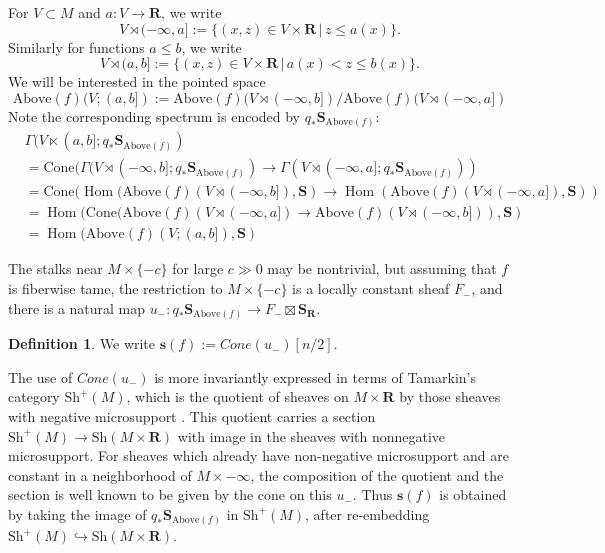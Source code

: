 \documentclass[12pt,a4paper]{article}
\numberwithin{equation}{section}
\theoremstyle{definition}
\newtheorem{dfn}[equation]{Definition}
\theoremstyle{remark}
\newcommand{\R}{\mathbf{R}}
\newcommand{\s}{\mathbf{s}}
\newcommand{\Sh}{\mathrm{Sh}}
\renewcommand{\S}{\mathbf{S}}
\DeclareMathOperator{\Hom}{Hom}
\begin{document}
For $V \subset M$ and $a: V \to \R$, we write
$$V \rtimes (-\infty, a] := \{(x, z) \in V \times \R\,|\, z \le a(x)\}.$$
Similarly for functions $a \le b$, we write
$$V \rtimes (a, b] := \{(x, z) \in V \times \R\,|\, a(x) < z \le b(x)\}.$$
We will be
interested in the
pointed space
$$\mathrm{Above}(f)(V; (a, b] ) :=
\mathrm{Above}(f)(V \rtimes (-\infty, b]) / \mathrm{Above}(f)(V \rtimes (-\infty, a])$$
Note the corresponding spectrum is encoded by
$q_* \S_{\mathrm{Above}(f)}$:
\begin{align} \label{Above f sheaf versus space}
\nonumber & \Gamma(V \ltimes (a, b]; q_* \S_{\mathrm{Above}(f)}) \\
\nonumber & =
\mathrm{Cone}(\Gamma(V \rtimes (-\infty, b]; q_* \S_{\mathrm{Above}(f)}) \to \Gamma(V \rtimes (-\infty, a]; q_* \S_{\mathrm{Above}(f)}))  \\
\nonumber & = \mathrm{Cone}( \Hom(\mathrm{Above}(f)(V \rtimes (-\infty, b]), \S )  \to \Hom ( \mathrm{Above}(f)(V \rtimes (-\infty, a]), \S))\\
\nonumber
& =  \Hom(\mathrm{Cone}(\mathrm{Above}(f)(V \rtimes (-\infty, a]) \to \mathrm{Above}(f)(V \rtimes (-\infty, b]) ) , \S)
\\
& = \Hom(\mathrm{Above}(f)(V; (a, b]), \S)
\end{align}


The stalks near $M\times \{-c\}$ for large $c\gg 0$ may be nontrivial, but assuming that $f$ is fiberwise tame, the restriction to $M\times\{-c\}$ is a locally constant
sheaf $F_-$, and there is a natural map  $u_-: q_* \S_{\mathrm{Above}(f)} \to F_-\boxtimes \S_\R$.

\begin{dfn} \label{associated sheaf}
We write $\s(f) := Cone(u_-)[n/2]$.
\end{dfn}

The use of $Cone(u_-)$ is more invariantly expressed in terms of Tamarkin's category $\Sh^+(M)$, which is the quotient of sheaves on $M \times \R$ by those sheaves with negative microsupport \cite{Tamarkin}.  This quotient carries a section $\Sh^+(M) \to \Sh(M \times \R)$ with image in the sheaves with nonnegative microsupport.  For sheaves which already have non-negative microsupport and are constant in a neighborhood of $M \times - \infty$, the composition of the quotient and the section is well known to be given by the cone on this $u_-$.  Thus $\s(f)$ is obtained by taking the image of $q_* \S_{\mathrm{Above}(f)}$ in $\Sh^+(M)$, after re-embedding
$\Sh^+(M) \hookrightarrow \Sh(M \times \R)$.
\end{document}
